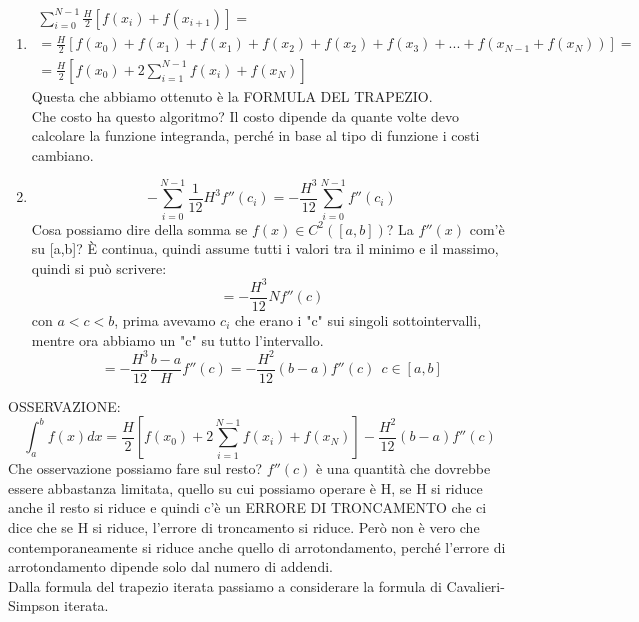 \documentclass[a4paper, portrait]{book}
\numberwithin{equation}{chapter} %
\begin{document}
\begin{enumerate}
    \item \begin{gather}
        \sum_{i=0}^{N-1} \frac{H}{2}\left[f(x_i)+f(x_{i+1})\right] = \\
        = \frac{H}{2}\left[f(x_0)+f(x_1)+f(x_1)+f(x_2)+f(x_2)+f(x_3)+...+f(x_{N-1}+f(x_N))\right] = \\
        = \frac{H}{2} \left[f(x_0) + 2 \sum_{i=1}^{N-1}f(x_i)+f(x_N)\right]
    \end{gather}
    Questa che abbiamo ottenuto è la FORMULA DEL TRAPEZIO.\\
    Che costo ha questo algoritmo? Il costo dipende da quante volte devo calcolare la funzione integranda, perché in base al tipo di funzione i costi cambiano.\\
    \item \begin{equation}
        -\sum_{i=0}^{N-1} \frac{1}{12} H^3 f''(c_i) = -\frac{H^3}{12} \sum_{i=0}^{N-1} f''(c_i)
    \end{equation}
    Cosa possiamo dire della somma se $f(x) \in C^2([a,b])$? La $f''(x)$ com'è su [a,b]? È continua, quindi assume tutti i valori tra il minimo e il massimo, quindi si può scrivere:
    \begin{equation}
        = -\frac{H^3}{12}Nf''(c)
    \end{equation}
    con $a < c < b$, prima avevamo $c_i$ che erano i "c" sui singoli sottointervalli, mentre ora abbiamo un "c" su tutto l'intervallo.
    \begin{equation}
        = -\frac{H^3}{12}\frac{b-a}{H}f''(c) = -\frac{H^2}{12}(b-a)f''(c) \ \ c \in [a,b]
    \end{equation}
\end{enumerate}
OSSERVAZIONE:
\begin{equation}
    \int_a^b f(x) dx = \frac{H}{2}\left[f(x_0)+ 2 \sum_{i=1}^{N-1}f(x_i)+f(x_N)\right] - \frac{H^2}{12}(b-a)f''(c)
\end{equation}
Che osservazione possiamo fare sul resto? $f''(c)$ è una quantità che dovrebbe essere abbastanza limitata, quello su cui possiamo operare è H, se H si riduce anche il resto si riduce e quindi c'è un ERRORE DI TRONCAMENTO che ci dice che se H si riduce, l'errore di troncamento si riduce. Però non è vero che contemporaneamente si riduce anche quello di arrotondamento, perché l'errore di arrotondamento dipende solo dal numero di addendi.\\
Dalla formula del trapezio iterata passiamo a considerare la formula di Cavalieri-Simpson iterata.
\end{document}

